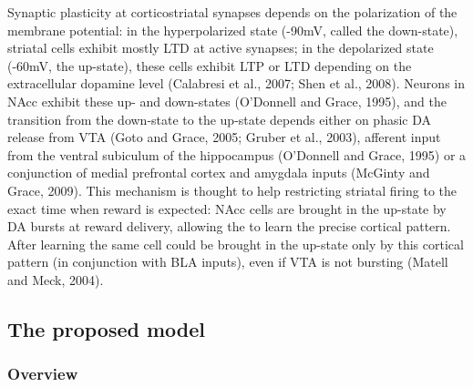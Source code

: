 \documentclass[
  11pt,
  a4paper,
]{scrbook}
\begin{document}
Synaptic plasticity at corticostriatal synapses depends on the
polarization of the membrane potential: in the hyperpolarized state
(-90mV, called the down-state), striatal cells exhibit mostly LTD at
active synapses; in the depolarized state (-60mV, the up-state), these
cells exhibit LTP or LTD depending on the extracellular dopamine level
(Calabresi et al., 2007; Shen et al., 2008). Neurons in NAcc exhibit
these up- and down-states (O'Donnell and Grace, 1995), and the
transition from the down-state to the up-state depends either on phasic
DA release from VTA (Goto and Grace, 2005; Gruber et al., 2003),
afferent input from the ventral subiculum of the hippocampus (O'Donnell
and Grace, 1995) or a conjunction of medial prefrontal cortex and
amygdala inputs (McGinty and Grace, 2009). This mechanism is thought to
help restricting striatal firing to the exact time when reward is
expected: NAcc cells are brought in the up-state by DA bursts at reward
delivery, allowing the to learn the precise cortical pattern. After
learning the same cell could be brought in the up-state only by this
cortical pattern (in conjunction with BLA inputs), even if VTA is not
bursting (Matell and Meck, 2004).

\subsection{The proposed model}\label{the-proposed-model}

\subsubsection*{Overview}\label{overview}
\end{document}

